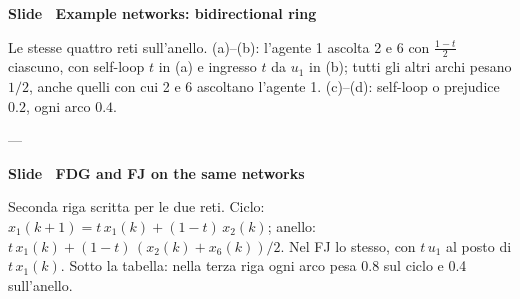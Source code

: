 \par\addvspace{14pt}\noindent\begin{minipage}{\textwidth}
{\color{unipd}\bfseries Slide  \textperiodcentered\ Example networks: bidirectional ring}\nuova\par\smallskip
{\small Le stesse quattro reti sull'anello. (a)--(b): l'agente 1 ascolta 2 e 6 con $\frac{1-t}{2}$ ciascuno, con self-loop $t$ in (a) e ingresso $t$ da $u_1$ in (b); tutti gli altri archi pesano $1/2$, anche quelli con cui 2 e 6 ascoltano l'agente 1. (c)--(d): self-loop o prejudice $0.2$, ogni arco $0.4$.}\par\smallskip
\noindent\begin{minipage}[t]{0.36\textwidth}\par
{\small ---}
\end{minipage}\hfill\begin{minipage}[t]{0.61\textwidth}\par
{}\par\smallskip
\end{minipage}\par
\end{minipage}\par
\par\addvspace{14pt}\noindent\begin{minipage}{\textwidth}
{\color{unipd}\bfseries Slide  \textperiodcentered\ FDG and FJ on the same networks}\par\smallskip
{\small Seconda riga scritta per le due reti. Ciclo: $x_1(k+1) = t\,x_1(k) + (1-t)\,x_2(k)$; anello: $t\,x_1(k) + (1-t)\,(x_2(k)+x_6(k))/2$. Nel FJ lo stesso, con $t\,u_1$ al posto di $t\,x_1(k)$. Sotto la tabella: nella terza riga ogni arco pesa 0.8 sul ciclo e 0.4 sull'anello.}\par\smallskip
\noindent\begin{minipage}[t]{0.36\textwidth}\par
{}\par\smallskip
\end{minipage}\hfill\begin{minipage}[t]{0.61\textwidth}\par
{}\par\smallskip
\end{minipage}\par
\end{minipage}\par
